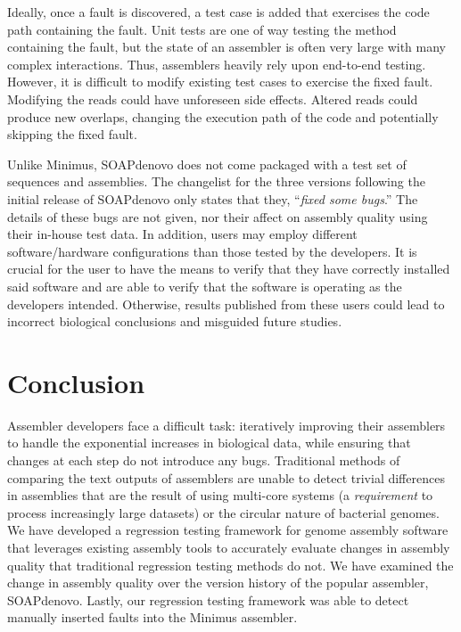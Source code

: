 \documentclass[12pt,\mydriver]{thesis}
\begin{document}
Ideally, once a fault is discovered, a test case is added that exercises the code path containing the fault.
Unit tests are one of way testing the method containing the fault, but the state of an assembler is often very large with many complex interactions.
Thus, assemblers heavily rely upon end-to-end testing.
However, it is difficult to modify existing test cases to exercise the fixed fault.
Modifying the reads could have unforeseen side effects.
Altered reads could produce new overlaps, changing the execution path of the code and potentially skipping the fixed fault.

Unlike Minimus, SOAPdenovo does not come packaged with a test set of sequences and assemblies.
The changelist for the three versions following the initial release of SOAPdenovo only states that they, ``\emph{fixed some bugs}.''
The details of these bugs are not given, nor their affect on assembly quality using their in-house test data.
In addition, users may employ different software/hardware configurations than those tested by the developers.
It is crucial for the user to have the means to verify that they have correctly installed said software and are able to verify that the software is operating as the developers intended.
Otherwise, results published from these users could lead to incorrect biological conclusions and misguided future studies.







\section{Conclusion}
\label{conclusion}
Assembler developers face a difficult task: iteratively improving their assemblers to handle the exponential increases in biological data, while ensuring that changes at each step do not introduce any bugs.
Traditional methods of comparing the text outputs of assemblers are unable to detect trivial differences in assemblies that are the result of using multi-core systems (a \emph{requirement} to process increasingly large datasets) or the circular nature of bacterial genomes.
We have developed a regression testing framework for genome assembly software that leverages existing assembly tools to accurately evaluate changes in assembly quality that traditional regression testing methods do not.
We have examined the change in assembly quality over the version history of the popular assembler, SOAPdenovo.
Lastly, our regression testing framework was able to detect manually inserted faults into the Minimus assembler.
\end{document}
